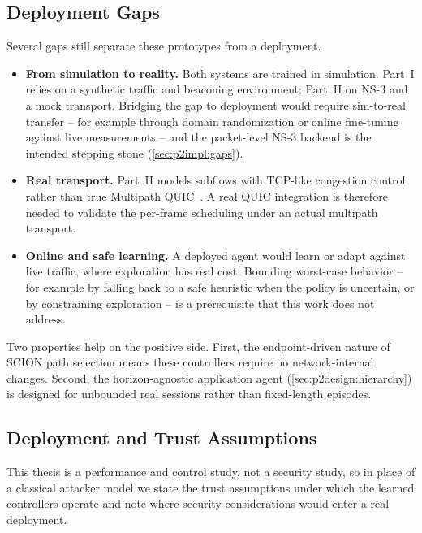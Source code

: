 \subsection{Deployment Gaps}
Several gaps still separate these prototypes from a deployment.

\begin{itemize}
  \item \textbf{From simulation to reality.} Both systems are trained in simulation. Part~I relies on a
  synthetic traffic and beaconing environment; Part~II on NS-3 and a mock transport. Bridging the gap to
  deployment would require sim-to-real transfer -- for example through domain randomization or online
  fine-tuning against live measurements -- and the packet-level NS-3 backend is the intended stepping stone
  (\cref{sec:p2impl:gaps}).
  \item \textbf{Real transport.} Part~II models subflows with TCP-like congestion control rather than true
  Multipath QUIC~\cite{DeConinck2017}. A real QUIC integration is therefore needed to validate the
  per-frame scheduling under an actual multipath transport.
  \item \textbf{Online and safe learning.} A deployed agent would learn or adapt against live traffic, where
  exploration has real cost. Bounding worst-case behavior -- for example by falling back to a safe heuristic
  when the policy is uncertain, or by constraining exploration -- is a prerequisite that this work does not
  address.
\end{itemize}

Two properties help on the positive side. First, the endpoint-driven nature of SCION path selection means
these controllers require no network-internal changes. Second, the horizon-agnostic application agent
(\cref{sec:p2design:hierarchy}) is designed for unbounded real sessions rather than fixed-length episodes.

\subsection{Deployment and Trust Assumptions}

This thesis is a performance and control study, not a security study, so in place of a classical
attacker model we state the trust assumptions under which the learned controllers operate and note
where security considerations would enter a real deployment.

